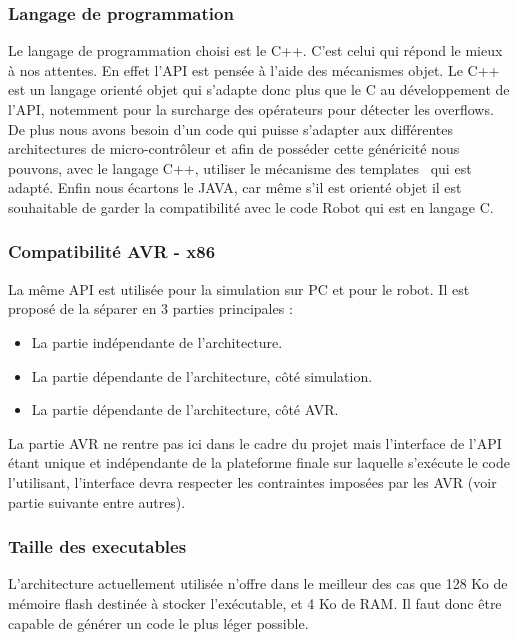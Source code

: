 \subsubsection{Langage de programmation}

Le langage de programmation choisi est le C++. C'est celui qui répond le mieux à nos attentes. En effet l'API est pensée à l'aide des mécanismes objet. Le C++ est un langage orienté objet qui s'adapte donc plus que le C au développement de l'API, notemment pour la surcharge des opérateurs pour détecter les overflows. De plus nous avons besoin d'un code qui puisse s'adapter aux différentes architectures de micro-contrôleur et afin de posséder cette généricité nous pouvons, avec le langage C++, utiliser le mécanisme des \og templates \fg\ qui est adapté. Enfin nous écartons le JAVA, car même s'il est orienté objet il est souhaitable de garder la compatibilité avec le code Robot qui est en langage C.

\subsubsection{Compatibilité AVR - x86}

La même API est utilisée pour la simulation sur PC et pour le robot. Il est proposé de la séparer en 3 parties principales :
\begin{itemize}
    \item{La partie indépendante de l'architecture.}
    \item{La partie dépendante de l'architecture, côté simulation.}
    \item{La partie dépendante de l'architecture, côté AVR.}
\end{itemize}

La partie AVR ne rentre pas ici dans le cadre du projet mais l'interface de l'API étant unique et indépendante de la plateforme finale sur laquelle s'exécute le code l'utilisant, l'interface devra respecter les contraintes imposées par les AVR (voir partie suivante entre autres).

\subsubsection{Taille des executables}

L'architecture actuellement utilisée n'offre dans le meilleur des cas que 128 Ko de mémoire flash destinée à stocker l'exécutable, et 4 Ko de RAM. Il faut donc être capable de générer un code le plus léger possible.

